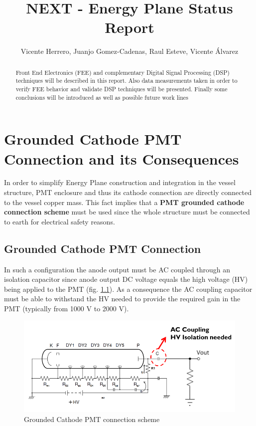\documentclass[a4paper,11pt]{report}
\title{NEXT - Energy Plane Status Report }
\author{Vicente Herrero, Juanjo Gomez-Cadenas, Raul Esteve, Vicente Álvarez}
\begin{document}
\maketitle
\tableofcontents

\begin{abstract}
Front End Electronics (FEE) and complementary Digital Signal Processing (DSP) techniques will be described in this report. Also data measurements taken in order to verify FEE behavior and validate DSP techniques will be presented. Finally some conclusions will be introduced as well as possible future work lines
\end{abstract}

\chapter{Grounded Cathode PMT Connection and its Consequences}
\par In order to simplify Energy Plane construction and integration in the vessel structure, PMT enclosure and thus its cathode connection are directly connected to the vessel copper mass. This fact implies that a \textbf{PMT grounded cathode connection scheme} must be used since the whole structure must be connected to earth for electrical safety reasons.



\section{Grounded Cathode PMT Connection}

\par In such a configuration the anode output must be AC coupled through an isolation capacitor since anode output DC voltage equals the high voltage (HV) being applied to the PMT (fig. \ref{fig:grounded_cathode}). As a consequence the AC coupling capacitor must be able to withstand the HV needed to provide the required gain in the PMT (typically from 1000 V to 2000 V). 

\begin{figure}
  \begin{center}
    \includegraphics[width=\textwidth]{./figures/grounded_cathode.pdf}
    \caption{Grounded Cathode PMT connection scheme}
    \label{fig:grounded_cathode}
  \end{center}
\end{figure}
\end{document}
